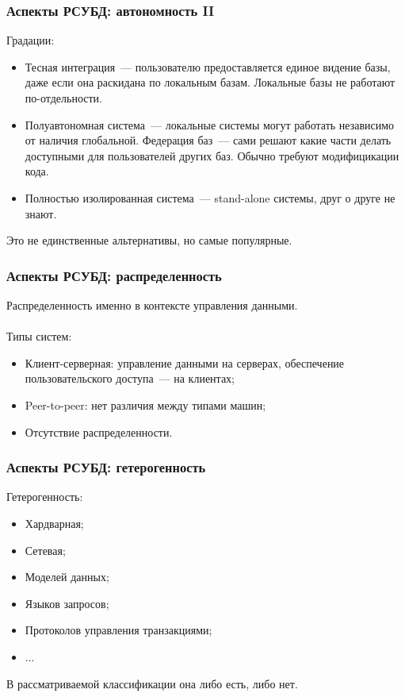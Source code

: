 \documentclass{beamer}
\begin{document}
\begin{frame}
\frametitle{Аспекты РСУБД: автономность II}
Градации:
	\begin{itemize}
		\item Тесная интеграция~--- пользователю предоставляется единое видение базы, даже если она раскидана по локальным базам. Локальные базы не работают по-отдельности.
		\item Полуавтономная система~--- локальные системы могут работать независимо от наличия глобальной. Федерация баз~--- сами решают какие части делать доступными для пользователей других баз. Обычно требуют модифицикации кода. 
		\item Полностью изолированная система~--- stand-alone системы, друг о друге не знают.
	\end{itemize}

Это не единственные альтернативы, но самые популярные.

\end{frame}

\begin{frame}
\frametitle{Аспекты РСУБД: распределенность}

Распределенность именно в контексте управления данными.\\~\\

Типы систем:
  \begin{itemize}
    \setlength\itemsep{1em}  
    \item Клиент-серверная: управление данными на серверах, обеспечение пользовательского доступа~--- на клиентах;
    \item Peer-to-peer: нет различия между типами машин;
    \item Отсутствие распределенности.
  \end{itemize}

\end{frame}

\begin{frame}
\frametitle{Аспекты РСУБД: гетерогенность}

Гетерогенность:
  \begin{itemize}
    \setlength\itemsep{1em}  
    \item Хардварная;
    \item Сетевая;
    \item Моделей данных;
    \item Языков запросов;
    \item Протоколов управления транзакциями;
    \item ...
  \end{itemize}

В рассматриваемой классификации она либо есть, либо нет.

\end{frame}
\end{document}
